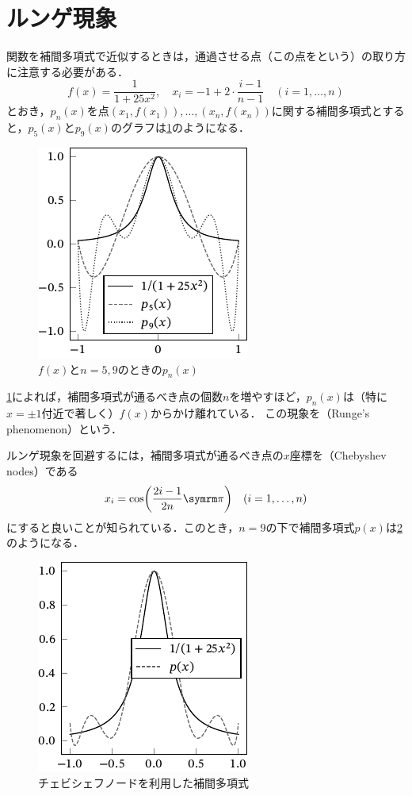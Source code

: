 \documentclass[../../main]{subfiles}
\begin{document}
\section{ルンゲ現象}
関数を補間多項式で近似するときは，通過させる点（この点をという）の取り方に注意する必要がある．
\[
  f(x) = \frac{1}{1+25x^2},
  \quad x_i = -1+2\cdot\frac{i-1}{n-1}\quad(i=1,\dots,n)
\]
とおき，\(p_n(x)\)を点\((x_1,f(x_1)),\dots,(x_n,f(x_n))\)に関する補間多項式とすると，\(p_5(x)\)と\(p_9(x)\)のグラフは\cref{figure:runge}のようになる．

\begin{figure}[htbp]
  \centering
  \includegraphics{runge.pdf}
  \caption{\(f(x)\)と\(n=5,9\)のときの\(p_n(x)\)}
  \label{figure:runge}
\end{figure}

\cref{figure:runge}によれば，補間多項式が通るべき点の個数\(n\)を増やすほど，\(p_n(x)\)は（特に\(x=\pm 1\)付近で著しく）\(f(x)\)からかけ離れている．
この現象を（Runge's phenomenon）という．

ルンゲ現象を回避するには，補間多項式が通るべき点の\(x\)座標を（Chebyshev nodes）である
\[
  x_i = \cos\pqty*{\frac{2i-1}{2n}\krez}\quad (i=1,\dots,n)
\]
にすると良いことが知られている\cite{horinouchi2015}．このとき，\(n=9\)の下で補間多項式\(p(x)\)は\cref{figure:chebyshev}のようになる．

\begin{figure}[htbp]
  \centering
  \includegraphics{chebyshev.pdf}
  \caption{チェビシェフノードを利用した補間多項式}
  \label{figure:chebyshev}
\end{figure}
\end{document}
